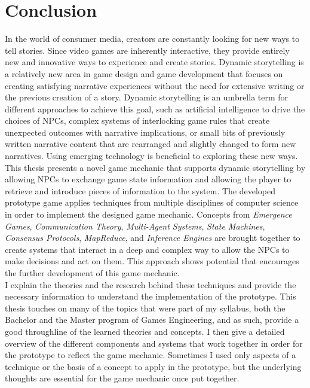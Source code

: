 \chapter{Conclusion}
In the world of consumer media, creators are constantly looking for new ways to tell stories. Since video games are inherently interactive, they provide entirely new and innovative ways to experience and create stories. Dynamic storytelling is a relatively new area in game design and game development that focuses on creating satisfying narrative experiences without the need for extensive writing or the previous creation of a story. Dynamic storytelling is an umbrella term for different approaches to achieve this goal, such as artificial intelligence to drive the choices of NPCs, complex systems of interlocking game rules that create unexpected outcomes with narrative implications, or small bits of previously written narrative content that are rearranged and slightly changed to form new narratives. Using emerging technology is beneficial to exploring these new ways.\\
This thesis presents a novel game mechanic that supports dynamic storytelling by allowing NPCs to exchange game state information and allowing the player to retrieve and introduce pieces of information to the system. The developed prototype game applies techniques from multiple disciplines of computer science in order to implement the designed game mechanic. Concepts from \textit{Emergence Games}, \textit{Communication Theory}, \textit{Multi-Agent Systems}, \textit{State Machines}, \textit{Consensus Protocols}, \textit{MapReduce}, and \textit{Inference Engines} are brought together to create systems that interact in a deep and complex way to allow the NPCs to make decisions and act on them. This approach shows potential that encourages the further development of this game mechanic.\\
I explain the theories and the research behind these techniques and provide the necessary information to understand the implementation of the prototype. This thesis touches on many of the topics that were part of my syllabus, both the Bachelor and the Master program of Games Engineering, and as such, provide a good throughline of the learned theories and concepts. I then give a detailed overview of the different components and systems that work together in order for the prototype to reflect the game mechanic. Sometimes I used only aspects of a technique or the basis of a concept to apply in the prototype, but the underlying thoughts are essential for the game mechanic once put together.\\
